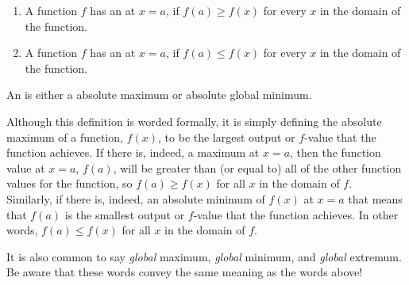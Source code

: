 \documentclass{ximera}
\begin{document}
\begin{definition}\hfil{}
\begin{enumerate}
\item A function $f$ has an  at $x=a$, if $f(a)\ge
  f(x)$ for every $x$ in the domain of the function.
\item A function $f$ has an  at $x=a$, if $f(a)\le
  f(x)$ for every $x$ in the domain of the function.
\end{enumerate} 
An  is either a
absolute maximum or absolute global minimum.  
\end{definition}

\begin{explanation}
Although this definition is worded formally, it is simply defining the absolute maximum of a function, $f(x)$, to be the largest output or $f$-value that the function achieves.  If there is, indeed, a maximum at $x=a$, then the function value at $x=a$, $f(a)$, will be greater than (or equal to) all of the other function values for the function, so $f(a) \geq f(x)$ for all $x$ in the domain of $f$.  \\

Similarly, if there is, indeed, an absolute minimum of $f(x)$ at $x=a$ that means that $f(a)$ is the smallest output or $f$-value that the function achieves.  In other words, $f(a) \leq f(x)$ for all $x$ in the domain of $f$. \\
\end{explanation}

\begin{warning}
It is also common to say \textit{global} maximum, \textit{global} minimum, and \textit{global} extremum.  Be aware that these words convey the same meaning as the words above! 
\end{warning}
\end{document}
